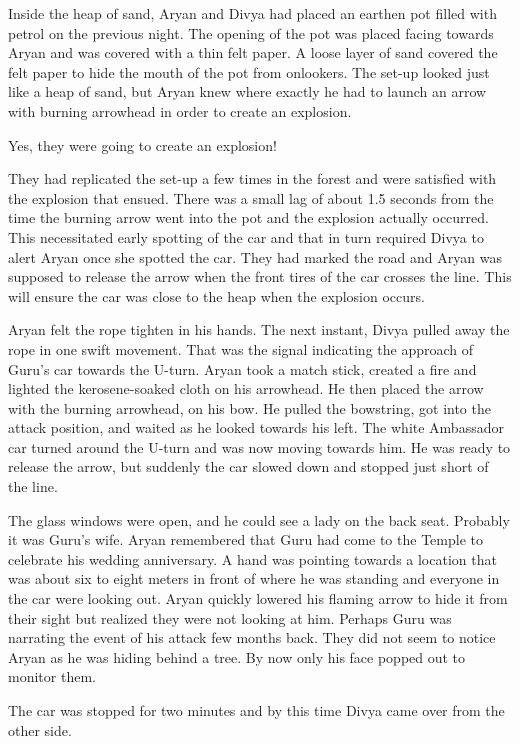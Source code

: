 Inside the heap of sand, Aryan and Divya had placed an earthen pot filled with
petrol on the previous night. The opening of the pot was placed facing
towards Aryan and was covered with a thin felt paper. A loose layer of sand
covered the felt paper to hide the mouth of the pot from onlookers. The set-up
looked just like a heap of sand, but Aryan knew where exactly he had to launch an
arrow with burning arrowhead in order to create an explosion.

Yes, they were going to create an explosion!

They had replicated the set-up a few times in the forest and were satisfied with
the explosion that ensued. There was a small lag of about 1.5 seconds from the
time the burning arrow went into the pot and the explosion actually occurred.
This necessitated early spotting of the car and that in turn required Divya to
alert Aryan once she spotted the car. They had marked the road and Aryan was
supposed to release the arrow when the front tires of the car crosses the line.
This will ensure the car was close to the heap when the explosion occurs.

Aryan felt the rope tighten in his hands. The next instant, Divya pulled away
the rope in one swift movement. That was the signal indicating the approach of
Guru's car towards the U-turn. Aryan took a match stick, created a fire and
lighted the kerosene-soaked cloth on his arrowhead. He then placed the arrow
with the burning arrowhead, on his bow. He pulled the bowstring, got into
the attack position, and waited as he looked towards his left. The white
Ambassador car turned around the U-turn and was now moving towards him. He was
ready to release the arrow, but suddenly the car slowed down and stopped just
short of the line.

The glass windows were open, and he could see a lady on the back seat. Probably
it was Guru's wife. Aryan remembered that Guru had come to the Temple to
celebrate his wedding anniversary. A hand was pointing towards a location that
was about six to eight meters in front of where he was standing and everyone in
the car were looking out. Aryan quickly lowered his flaming arrow to hide it
from their sight but realized they were not looking at him. Perhaps Guru was
narrating the event of his attack few months back. They did not seem to notice
Aryan as he was hiding behind a tree. By now only his face popped out to monitor
them.

The car was stopped for two minutes and by this time Divya came over from the
other side.

